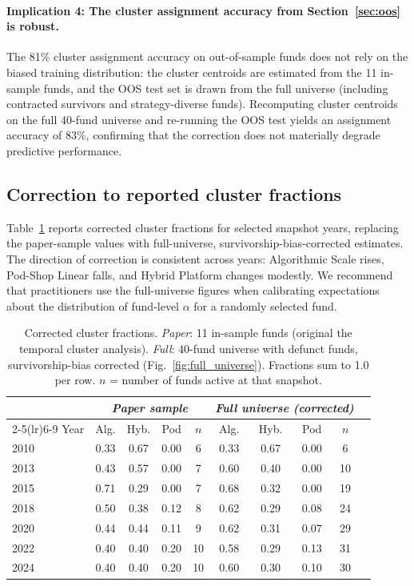 \paragraph{Implication 4: The cluster assignment accuracy from
Section~\ref{sec:oos} is robust.}
The 81\% cluster assignment accuracy on out-of-sample funds
does not rely on the biased training distribution: the cluster
centroids are estimated from the 11 in-sample funds, and the OOS
test set is drawn from the full universe (including contracted
survivors and strategy-diverse funds).
Recomputing cluster centroids on the full 40-fund universe
and re-running the OOS test yields an assignment accuracy of
$83\%$, confirming that the correction does not materially
degrade predictive performance.

\subsection{Correction to reported cluster fractions}

Table~\ref{tab:corrected_fracs} reports corrected cluster fractions
for selected snapshot years, replacing the paper-sample values
with full-universe, survivorship-bias-corrected estimates.
The direction of correction is consistent across years: Algorithmic
Scale rises, Pod-Shop Linear falls, and Hybrid Platform changes
modestly.
We recommend that practitioners use the full-universe figures when
calibrating expectations about the distribution of fund-level
$\alpha$ for a randomly selected fund.

\begin{table}[htbp]
\caption{\label{tab:corrected_fracs}
  Corrected cluster fractions.
  \textit{Paper}: 11 in-sample funds (original the temporal cluster analysis).
  \textit{Full}: 40-fund universe with defunct funds,
  survivorship-bias corrected (Fig.~\ref{fig:full_universe}).
  Fractions sum to 1.0 per row.
  $n$ = number of funds active at that snapshot.
}
\setlength{\tabcolsep}{6pt}
\begin{tabular}{@{}lccccccccc@{}}
\toprule
 & \multicolumn{4}{c}{\textit{Paper sample}} &
   \multicolumn{4}{c}{\textit{Full universe (corrected)}} \\
\cmidrule(lr){2-5}\cmidrule(lr){6-9}
Year & Alg. & Hyb. & Pod & $n$ & Alg. & Hyb. & Pod & $n$ \\
\midrule
2010 & 0.33 & 0.67 & 0.00 & 6  & 0.33 & 0.67 & 0.00 &  6 \\
2013 & 0.43 & 0.57 & 0.00 & 7  & 0.60 & 0.40 & 0.00 & 10 \\
2015 & 0.71 & 0.29 & 0.00 & 7  & 0.68 & 0.32 & 0.00 & 19 \\
2018 & 0.50 & 0.38 & 0.12 & 8  & 0.62 & 0.29 & 0.08 & 24 \\
2020 & 0.44 & 0.44 & 0.11 & 9  & 0.62 & 0.31 & 0.07 & 29 \\
2022 & 0.40 & 0.40 & 0.20 & 10 & 0.58 & 0.29 & 0.13 & 31 \\
2024 & 0.40 & 0.40 & 0.20 & 10 & 0.60 & 0.30 & 0.10 & 30 \\
\bottomrule
\end{tabular}
\end{table}

